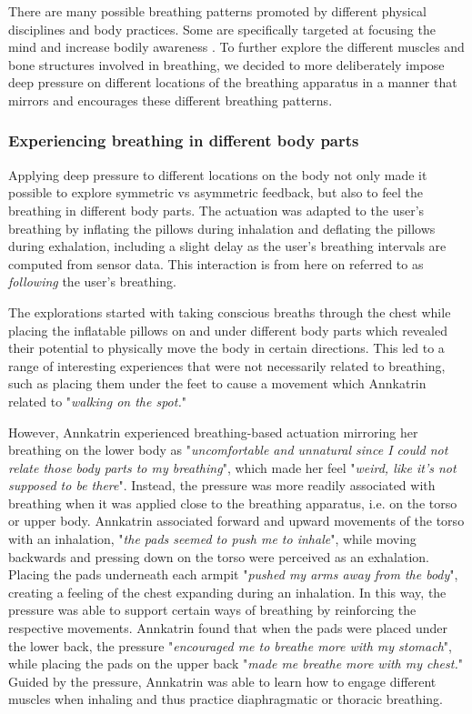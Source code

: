 There are many possible breathing patterns promoted by different physical disciplines and body practices. Some are specifically targeted at focusing the mind and increase bodily awareness \cite{kupershmidt_definition_2019, burke_role_2008}. To further explore the different muscles and bone structures involved in breathing, we decided to more deliberately impose deep pressure on different locations of the breathing apparatus in a manner that mirrors and encourages these different breathing patterns.  

\subsubsection{Experiencing breathing in different body parts}
Applying deep pressure to different locations on the body not only made it possible to explore symmetric vs asymmetric feedback, but also to feel the breathing in different body parts. The actuation was adapted to the user's breathing by inflating the pillows during inhalation and deflating the pillows during exhalation, including a slight delay as the user’s breathing intervals are computed from sensor data. This interaction is from here on referred to as \textit{following} the user's breathing.

The explorations started with taking conscious breaths through the chest while placing the inflatable pillows on and under different body parts which revealed their potential to physically move the body in certain directions. This led to a range of interesting experiences that were not necessarily related to breathing, such as placing them under the feet to cause a movement which Annkatrin related to "\textit{walking on the spot.}" 

However, Annkatrin experienced breathing-based actuation mirroring her breathing on the lower body as "\textit{uncomfortable and unnatural since I could not relate those body parts to my breathing}", which made her feel "\textit{weird, like it's not supposed to be there}". Instead, the pressure was more readily associated with breathing when it was applied close to the breathing apparatus, i.e. on the torso or upper body. Annkatrin associated forward and upward movements of the torso with an inhalation, "\textit{the pads seemed to push me to inhale}", while moving backwards and pressing down on the torso were perceived as an exhalation. Placing the pads underneath each armpit "\textit{pushed my arms away from the body}", creating a feeling of the chest expanding during an inhalation. In this way, the pressure was able to support certain ways of breathing by reinforcing the respective movements. Annkatrin found that when the pads were placed under the lower back, the pressure "\textit{encouraged me to breathe more with my stomach}", while placing the pads on the upper back "\textit{made me breathe more with my chest.}" Guided by the pressure, Annkatrin was able to learn how to engage different muscles when inhaling and thus practice diaphragmatic or thoracic breathing.


